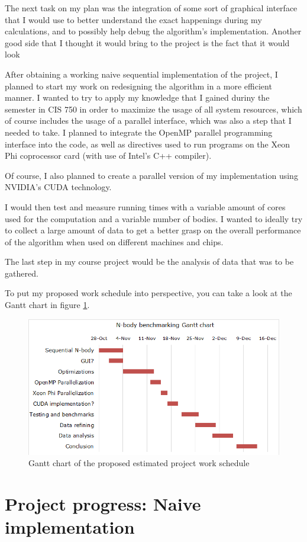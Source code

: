 \documentclass[journal]{IEEEtran}
\begin{document}
		The next task on my plan was the integration of some sort of graphical interface that I would use to better understand the exact happenings during my calculations, and to possibly help debug the algorithm's implementation. Another good side that I thought it would bring to the project is the fact that it would look
		
		After obtaining a working naive sequential implementation of the project, I planned to start my work on redesigning the algorithm in a more efficient manner. I wanted to try to apply my knowledge that I gained duriny the semester in CIS 750 in order to maximize the usage of all system resources, which of course includes the usage of a parallel interface, which was also a step that I needed to take. I planned to integrate the OpenMP parallel programming interface into the code, as well as directives used to run programs on the Xeon Phi coprocessor card (with use of Intel's C++ compiler).
		
		Of course, I also planned to create a parallel version of my implementation using NVIDIA’s CUDA technology.
		
		I would then test and measure running times with a variable amount of cores used for the computation and a variable number of bodies. I wanted to ideally try to collect a large amount of data to get a better grasp on the overall performance of the algorithm when used on different machines and chips.
		
		The last step in my course project would be the analysis of data that was to be gathered.
		
		To put my proposed work schedule into perspective, you can take a look at the Gantt chart in figure \ref{gantt}.
		
		\begin{figure}[ht]
			\centering
			\includegraphics[width=.5\textwidth]{gantt.png}
			\caption{\label{gantt}Gantt chart of the proposed estimated project work schedule}
		\end{figure} 
		
	\section{Project progress: Naive implementation}
	
\end{document}
